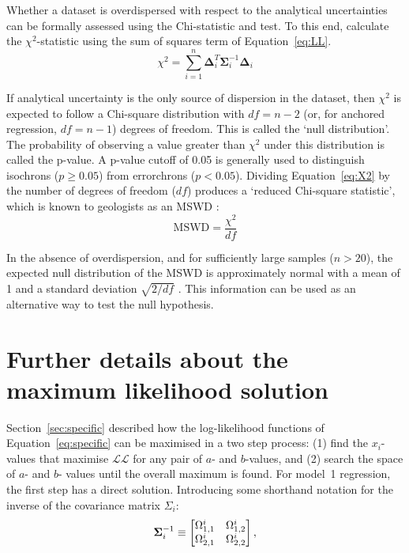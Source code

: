 \documentclass{article}
\begin{document}
Whether a dataset is overdispersed with respect to the analytical
uncertainties can be formally assessed using the Chi-statistic and
test. To this end, calculate the $\chi^2$-statistic using the sum of
squares term of Equation~\ref{eq:LL}.
\begin{equation}
  \chi^2 = \sum\limits_{i=1}^{n} \mathbf{\Delta}_i^T \mathbf{\Sigma}_i^{-1} \mathbf{\Delta}_i
  \label{eq:X2}
\end{equation}

If analytical uncertainty is the only source of dispersion in the
dataset, then $\chi^2$ is expected to follow a Chi-square distribution
with $df=n-2$ (or, for anchored regression, $df=n-1$) degrees of
freedom.  This is called the `null distribution'. The probability of
observing a value greater than $\chi^2$ under this distribution is
called the p-value. A p-value cutoff of 0.05 is generally used to
distinguish isochrons ($p\geq{0.05}$) from errorchrons
($p<0.05$). Dividing Equation~\ref{eq:X2} by the number of degrees of
freedom ($df$) produces a `reduced Chi-square statistic', which is
known to geologists as an MSWD \citep{mcintyre1966}:
\begin{equation}
  \mbox{MSWD} = \frac{\chi^2}{df}
  \label{eq:MSWD}
\end{equation}

In the absence of overdispersion, and for sufficiently large samples
($n>20$), the expected null distribution of the MSWD is approximately
normal with a mean of 1 and a standard deviation $\sqrt{2/df}$
\citep{wendt1991}. This information can be used as an alternative
way to test the null hypothesis.

\section{Further details about the maximum likelihood solution}\label{app:algorithm}

Section~\ref{sec:specific} described how the log-likelihood functions
of Equation~\ref{eq:specific} can be maximised in a two step process:
(1) find the $x_i$-values that maximise $\mathcal{LL}$ for any pair of
$a$- and $b$-values, and (2) search the space of $a$- and $b$- values
until the overall maximum is found. For model~1 regression, the first
step has a direct solution. Introducing some shorthand notation for
the inverse of the covariance matrix $\Sigma_i$:
\begin{equation}
  \mathbf{\Sigma}_i^{-1} 
  \equiv
  \left[
  \begin{array}{@{}cc@{}}
    \Omega_{1,1}^i & \Omega_{1,2}^i\\
    \Omega_{2,1}^i & \Omega_{2,2}^i
  \end{array}
  \right],
\end{equation}
\end{document}
